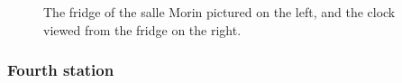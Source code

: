 \documentclass[12pt,twoside,maitrise]{dms_ks}
\theoremstyle{definition}
\begin{document}
{\begin{figure}[h]
    \centering
    \caption{The fridge of the salle Morin pictured on the left, and the clock viewed from the fridge on the right.}
    \label{fig:sidebyside}
\end{figure}

\subsubsection{Fourth station}

}
\end{document}
